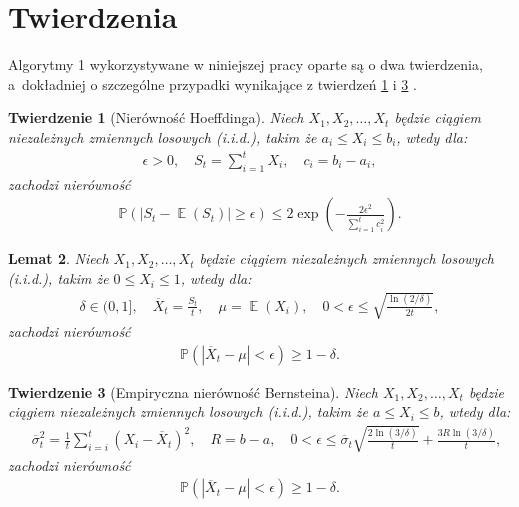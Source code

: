 \documentclass[inzynierska]{pwr_wmat_praca_dyplomowa}
\theoremstyle{plain}
\newtheorem{theorem}{Twierdzenie}
\numberwithin{theorem}{chapter}
\newtheorem{lemma}[theorem]{Lemat}
\theoremstyle{definition}
\numberwithin{theorem}{chapter}
\DeclareMathOperator{\EX}{\mathbb{E}}%
\newcommand{\probP}{\mathbb{P}}
\begin{document}
	\section{Twierdzenia}
	Algorytmy 1  wykorzystywane w niniejszej pracy oparte są o dwa twierdzenia, a~dokładniej o szczególne przypadki wynikające z twierdzeń \ref{Hoeffding ineq} i \ref{Bernsteina emp ineq} \cite{heidrich2011non}.
	\begin{theorem}[Nierówność Hoeffdinga]
		\label{Hoeffding ineq}
		Niech $X_1, X_2, \dots, X_t$ będzie ciągiem niezależnych zmiennych losowych (i.i.d.), takim że $a_i \le X_i \le b_i$, wtedy dla:
		\begin{gather*}
			\epsilon > 0,\quad
			S_t = \sum_{i=1}^{t} X_i, \quad c_i = b_i - a_i,
		\end{gather*}
		zachodzi nierówność
		\begin{gather*}
			\label{eq:Hoeffding ineq}
			\probP(|S_t - \EX(S_t)| \ge \epsilon ) \le 2 \exp\left(-\frac{2\epsilon^2}{\sum_{i=1}^{t} c_i^2} \right).
		\end{gather*}
	\end{theorem}
	\begin{lemma}
		\label{Hoeffding ineq lemma}
		Niech $X_1, X_2, \dots, X_t$ będzie ciągiem niezależnych zmiennych losowych (i.i.d.), takim że $0 \le X_i \le 1$, wtedy dla: 
		\begin{gather*}
			\delta\in (0, 1], \quad
			\overline{X}_t = \frac{S_t}{t},\quad 
			\mu = \EX(X_i), \quad  	
			0 < \epsilon \le  \sqrt{\frac{\ln(2/\delta)}{2t}},
		\end{gather*}
	zachodzi nierówność
		\begin{gather*}
			\probP(|\overline{X}_t - \mu | < \epsilon ) \ge 1 - \delta.
		\end{gather*}
	\end{lemma}
	\begin{theorem}[Empiryczna nierówność Bernsteina]
		\label{Bernsteina emp ineq}
		Niech $X_1, X_2, \dots, X_t$ będzie ciągiem niezależnych zmiennych losowych (i.i.d.), takim że $a \le X_i \le b$, wtedy dla:
		\begin{gather}
			\quad \overline \sigma_t^2 = \frac{1}{t}\sum_{i=i}^{t}(X_i - \overline{X}_t)^2,\quad R = b-a ,\quad
			\label{eq:Bernstein ineq}
			0 < \epsilon \le \overline{\sigma}_t \sqrt{\frac{2\ln(3/\delta)}{t}} + \frac{3 R \ln{(3 / \delta)}}{t},
		\end{gather}
		zachodzi nierówność
		\begin{gather*}
			\probP(|\overline{X}_t - \mu | < \epsilon ) \ge 1 - \delta.
		\end{gather*}
	\end{theorem}
\end{document}
